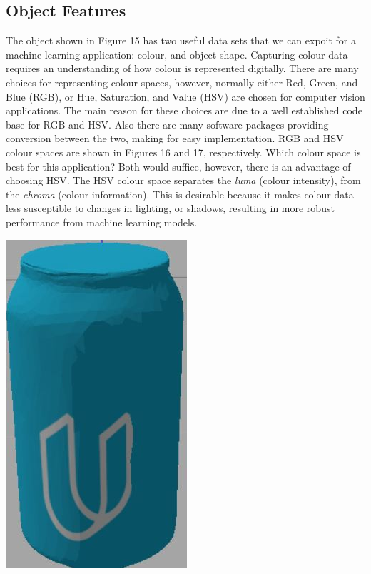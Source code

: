\documentclass[a4paper]{article}
\begin{document}
\subsection{Object Features}
\begin{minipage}{0.66\textwidth}
The object shown in Figure 15 has two useful data sets that we can expoit for a machine learning application: colour, and object shape. Capturing colour data requires an understanding of how colour is represented digitally. There are many choices for representing colour spaces, however, normally either Red, Green, and Blue (RGB), or Hue, Saturation, and Value (HSV) are chosen for computer vision applications. The main reason for these choices are due to a well established code base for RGB and HSV. Also there are many software packages providing conversion between the two, making for easy implementation. RGB and HSV colour spaces are shown in Figures 16 and 17, respectively. Which colour space is best for this application? Both would suffice, however, there is an advantage of choosing HSV. The HSV colour space separates the \textit{luma} (colour intensity), from the \textit{chroma} (colour information). This is desirable because it makes colour data less susceptible to changes in lighting, or shadows, resulting in more robust performance from machine learning models.
\end{minipage}
\hspace{0.5cm}
\begin{minipage}{0.25\textwidth}
		\centering
		\includegraphics[scale=0.5]{can_image}
\end{minipage}
	
\end{document}
